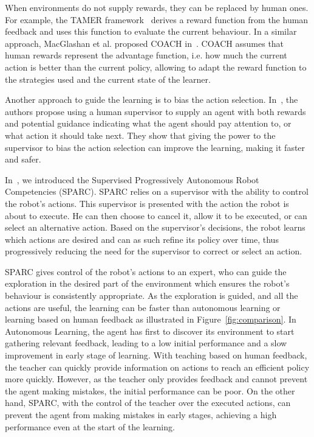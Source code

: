 \documentclass[letterpaper]{article} %
\begin{document}
When environments do not supply rewards, they can be replaced by human ones. For
example, the TAMER framework~\cite{knox2009interactively} derives a reward
function from the human feedback and uses this function to evaluate the current
behaviour. In a similar approach, MacGlashan et al. proposed COACH
in~\cite{macglashan2017interactive}. COACH assumes that human rewards represent
the advantage function, i.e. how much the current action is better than the
current policy, allowing to adapt the reward function to the strategies used and
the current state of the learner.

Another approach to guide the learning is to bias the action selection.
In~\cite{thomaz2008teachable}, the authors propose using a human supervisor to
supply an agent with both rewards and potential guidance indicating what the
agent should pay attention to, or what action it should take next. They show
that giving the power to the supervisor to bias the action selection can improve
the learning, making it faster and safer.

In~\cite{senft2015sparc}, we introduced the Supervised Progressively Autonomous
Robot Competencies (SPARC). SPARC relies on a supervisor with the ability to
control the robot's actions. This supervisor is presented with the action the
robot is about to execute. He can then choose to cancel it, allow it to be
executed, or can select an alternative action. Based on the supervisor's
decisions, the robot learns which actions are desired and can as such refine its
policy over time, thus progressively reducing the need for the supervisor to correct or select an
action.

SPARC gives control of the robot's actions to an expert, who can guide the
exploration in the desired part of the environment which ensures the robot's
behaviour is consistently appropriate. As the exploration is guided, and all the
actions are useful, the learning can be faster than autonomous learning or
learning based on human feedback as illustrated in Figure~\ref{fig:comparison}.
In Autonomous Learning, the agent has first to discover its environment to start
gathering relevant feedback, leading to a low initial performance and a slow
improvement in early stage of learning. With teaching based on human
feedback, the teacher can quickly provide information on actions to reach an efficient policy more
quickly. However, as the teacher only provides feedback and
cannot prevent the agent making mistakes, the initial performance can be poor.
On the other hand, SPARC, with the control of the teacher over the executed
actions, can prevent the agent from making mistakes in early stages, achieving a high
performance even at the start of the learning. 
\end{document}
